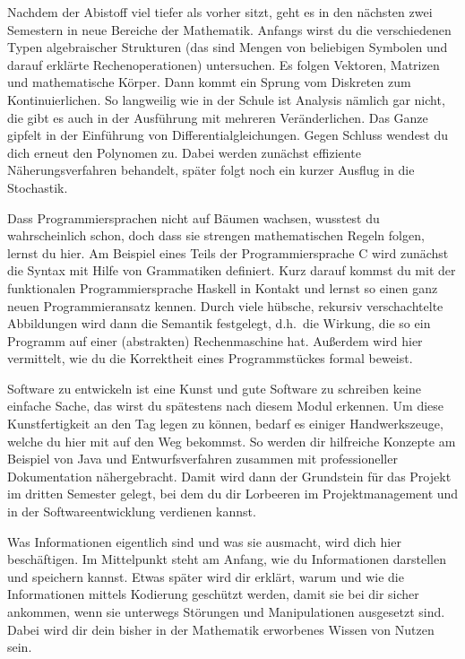 
Nachdem der Abistoff viel tiefer als vorher sitzt, geht es in den nächsten zwei Semestern in neue Bereiche der Mathematik.
Anfangs wirst du die verschiedenen Typen algebraischer Strukturen (das sind Mengen von beliebigen Symbolen und darauf erklärte Rechenoperationen) untersuchen.
Es folgen Vektoren, Matrizen und mathematische Körper.
Dann kommt ein Sprung vom Diskreten zum Kontinuierlichen.
So langweilig wie in der Schule ist Analysis nämlich gar nicht, die gibt es auch in der Ausführung mit mehreren Veränderlichen.
Das Ganze gipfelt in der Einführung von Differentialgleichungen.
Gegen Schluss wendest du dich erneut den Polynomen zu.
Dabei werden zunächst effiziente Näherungsverfahren behandelt, später folgt noch ein kurzer Ausflug in die Stochastik.

Dass Programmiersprachen nicht auf Bäumen wachsen, wusstest du wahrscheinlich schon, doch dass sie strengen mathematischen Regeln folgen, lernst du hier.
Am Beispiel eines Teils der Programmiersprache C wird zunächst die Syntax mit Hilfe von Grammatiken definiert.
Kurz darauf kommst du mit der funktionalen Programmiersprache Haskell in Kontakt und lernst so einen ganz neuen Programmieransatz kennen.
Durch viele hübsche, rekursiv verschachtelte Abbildungen wird dann die Semantik festgelegt, d.h.\ die Wirkung, die so ein Programm auf einer (abstrakten) Rechenmaschine hat.
Außerdem wird hier vermittelt, wie du die Korrektheit eines Programmstückes formal beweist.

Software zu entwickeln ist eine Kunst und gute Software zu schreiben keine einfache Sache, das wirst du spätestens nach diesem Modul erkennen.
Um diese Kunstfertigkeit an den Tag legen zu können, bedarf es einiger Handwerkszeuge, welche du hier mit auf den Weg bekommst.
So werden dir hilfreiche Konzepte am Beispiel von Java und Entwurfsverfahren zusammen mit professioneller Dokumentation nähergebracht.
Damit wird dann der Grundstein für das Projekt im dritten Semester gelegt, bei dem du dir Lorbeeren im Projektmanagement und in der Softwareentwicklung verdienen kannst.


\newpage

Was Informationen eigentlich sind und was sie ausmacht, wird dich hier beschäftigen.
Im Mittelpunkt steht am Anfang, wie du Informationen darstellen und speichern kannst.
Etwas später wird dir erklärt, warum und wie die Informationen mittels Kodierung geschützt werden, damit sie bei dir sicher ankommen, wenn sie unterwegs Störungen und Manipulationen ausgesetzt sind.
Dabei wird dir dein bisher in der Mathematik erworbenes Wissen von Nutzen sein.

